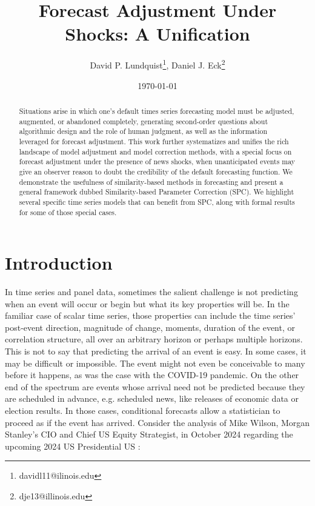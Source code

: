 \documentclass[11pt]{article}
\title{Forecast Adjustment Under Shocks: A Unification}
\author{David P. Lundquist\thanks{davidl11@ilinois.edu}, Daniel J. Eck\thanks{dje13@illinois.edu} }
\affil{Department of Statistics, University of Illinois at Urbana-Champaign}
\date{\today}
\theoremstyle{definition}
\begin{document}
\maketitle

\begin{abstract} 
 Situations arise in which one's default times series forecasting model must be adjusted, augmented, or abandoned completely, generating second-order questions about algorithmic design and the role of human judgment, as well as the information leveraged for forecast adjustment.  This work further systematizes and unifies the rich landscape of model adjustment and model correction methods, with a special focus on forecast adjustment under the presence of news shocks, when unanticipated events may give an observer reason to doubt the credibility of the default forecasting function.  We demonstrate the usefulness of similarity-based methods in forecasting and present a general framework dubbed Similarity-based Parameter Correction (SPC).  We highlight several specific time series models that can benefit from SPC, along with formal results for some of those special cases.
\end{abstract}
  
\section{Introduction}\label{Introduction}

In time series and panel data, sometimes the salient challenge is not predicting when an event will occur or begin but what its key properties will be.  In the familiar case of scalar time series, those properties can include the time series' post-event direction, magnitude of change, moments, duration of the event, or correlation structure, all over an arbitrary horizon or perhaps multiple horizons. This is not to say that predicting the arrival of an event is easy. In some cases, it may be difficult or impossible.  The event might not even be conceivable to many before it happens, as was the case with the COVID-19 pandemic.  On the other end of the spectrum are events whose arrival need not be predicted because they are scheduled in advance, e.g. scheduled news, like releases of economic data or election results.  In those cases, conditional forecasts allow a statistician to proceed as if the event has arrived.  Consider the analysis of Mike Wilson, Morgan Stanley’s CIO and Chief US Equity  Strategist, in October 2024 regarding the upcoming 2024 US Presidential US \citep{thoughts_on_market}:
\end{document}
